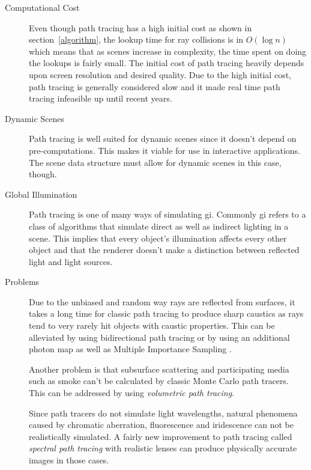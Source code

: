 \documentclass[
  twoside,
  11pt, a4paper,
  footinclude=true,
  headinclude=true,
  cleardoublepage=empty
]{scrreprt}
\begin{document}
\begin{description}
    \item[Computational Cost]
        Even though path tracing has a high initial cost as shown in section~\ref{algorithm}, the lookup time for ray collisions is in
        \(O(\log n)\) which means that as scenes increase in complexity, the time spent on doing the
        lookups is fairly small. The initial cost of path tracing heavily depends upon screen resolution
        and desired quality. Due to the high initial cost, path tracing is generally considered slow and
        it made real time path tracing infeasible up until recent years.

    \item[Dynamic Scenes]
        Path tracing is well suited for dynamic scenes since it doesn't depend on pre-computations. This
        makes it viable for use in interactive applications. The scene data structure must allow for
        dynamic scenes in this case, though.

    \item[Global Illumination]
        Path tracing is one of many ways of simulating \acf{gi}.
        Commonly \ac{gi} refers to a class of algorithms that simulate direct as well as indirect
        lighting in a scene. This implies that every object's illumination affects every other object and that the
        renderer doesn't make a distinction between reflected light and light sources.

    \item[Problems]
        Due to the unbiased and random way rays are reflected from surfaces, it takes a long time for
        classic path tracing to
        produce sharp caustics as rays tend to very rarely hit objects with caustic properties. This can be
        alleviated by using bidirectional path tracing \cite{techreport:pbr} or by using an
        additional photon map as well as Multiple Importance Sampling \cite{veach1997robust}.

        Another problem is that subsurface scattering and participating media such as smoke can't be
        calculated by classic Monte Carlo path
        tracers. This can be addressed by using \emph{volumetric path tracing}.
        \cite{wiki:volumetric-path-tracing} \cite{incollection:volumetric-path-tracing}

        Since path tracers do not simulate light wavelengths, natural phenomena caused by chromatic
        aberration, fluorescence and iridescence can not be realistically simulated. A fairly new
        improvement to path tracing called \emph{spectral path tracing} with realistic lenses can produce
        physically accurate images in those cases. \cite{inproceedings:realistic-lenses} \cite{site:lambda}
        \cite{site:luculentus} \cite{site:robigo-luculenta}
\end{description}
\end{document}
